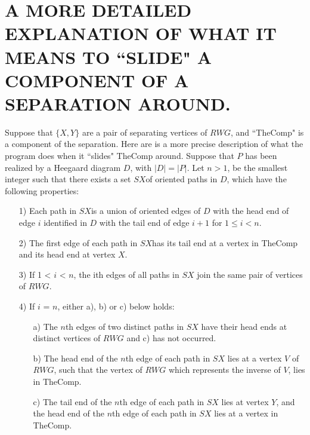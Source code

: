\documentclass[12pt]{amsart}
\begin{document}
                        
\section{A MORE DETAILED EXPLANATION OF WHAT IT MEANS TO ``SLIDE" A COMPONENT OF A SEPARATION AROUND.}
                                
                Suppose that $\{ X, Y\}$ are a pair of separating vertices of $RWG$, and  ``TheComp" is a
        component of the separation. Here are is a more precise description of what the program
        does when it  ``slides" TheComp around. Suppose that $P$ has been realized by a Heegaard
        diagram $D$, with $|D| = |P|$. Let $n > 1$, be the smallest integer such that there exists a
        set $SX$of oriented paths in $D$, which have the following properties:
        \begin{enumerate}
                \item[1)]      Each path in $SX$is a union of oriented edges of $D$ with the head end of edge $i$
                        identified in $D$ with the tail end of edge $i+1$ for $ 1 \leq i <  n$.
                \item[2)]      The first edge of each path in $SX$has its tail end at a vertex in TheComp and
                        its head end at vertex $X$.
                \item[3)]      If 1 < $i$ < $n$, the ith edges of all paths in $SX$ join the same pair of vertices of
                        $RWG$.
                \item[4)]      If $i$ = $n$, either a), b) or c) below holds:
                  \begin{enumerate}
                        \item[a)]      The $n$th edges of two distinct paths in $SX$ have their head ends at distinct
                                vertices of $RWG$ and c) has not occurred.
                        \item[b)]      The head end of the $n$th edge of each path in $SX$ lies at a vertex $V$ of $RWG$,
                                such that the vertex of $RWG$ which represents the inverse of $V$, lies in
                                TheComp.
                        \item[c)]      The tail end of the $n$th edge of each path in $SX$ lies at vertex $Y$, and the
                                head end of the $n$th edge of each path in $SX$ lies at a vertex in TheComp.
                  \end{enumerate}
                  \end{enumerate}
\end{document}
